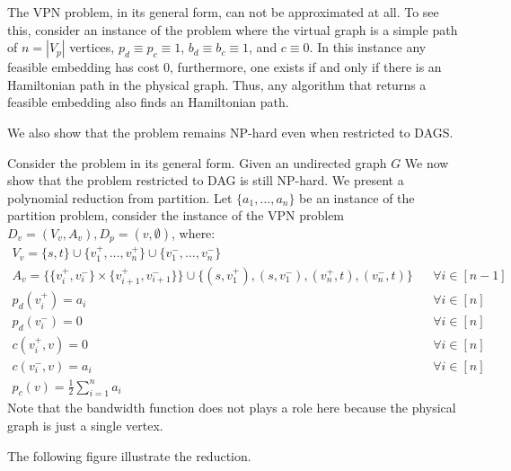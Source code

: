 The VPN problem, in its general form, can not be approximated at all.
To see this, consider an instance of the problem where the virtual graph is a simple path of $n = |V_p|$ vertices, $p_d \equiv p_c \equiv 1$, 
$b_d \equiv b_c \equiv 1$,
and $c \equiv 0$.
In this instance any feasible embedding has cost 0, furthermore, one exists if and only if there is an Hamiltonian path in the physical graph.
Thus, any algorithm that returns a feasible embedding also finds an Hamiltonian path.

We also show that the problem remains NP-hard even when restricted to DAGS.

Consider the problem in its general form. 
Given an undirected graph $G$
We now show that the problem restricted to DAG is still NP-hard.
We present a polynomial reduction from partition.
Let $\{a_1, \ldots, a_n\}$ be an instance of the partition problem, 
consider the instance of the VPN problem 
$D_v = (V_v, A_v), D_p = ({v}, \emptyset)$, 
where:
\begin{align}
V_v = \{s, t\} \cup \{v_1^+, \ldots, v_n^+\} \cup \{v_1^-, \ldots, v_n^-\}
\\
A_v = \{\{v_i^+, v_i^-\} \times \{v_{i + 1}^+, v_{i + 1}^-\}\} 
\cup \{(s, v_1^+), (s, v_1^-), (v_n^+, t), (v_n^-, t)\}
&&
\forall i \in [n-1]
\\
p_d(v_i^+) = a_i && \forall i \in [n]
\\
p_d(v_i^-) = 0 && \forall i \in [n]
\\
c(v_i^+, v) = 0 && \forall i \in [n]
\\
c(v_i^-, v) = a_i && \forall i \in [n] 
\\
p_c(v) = \frac{1}{2}\sum_{i = 1}^n a_i
\end{align}
Note that the bandwidth function does not plays a role here because the physical graph
is just a single vertex.

The following figure illustrate the reduction.
\begin{figure}[ht]
\centering

\end{figure}

